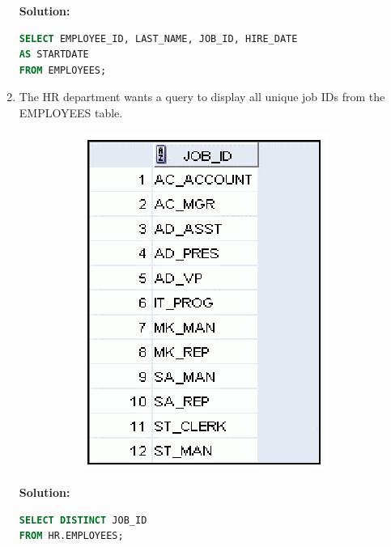 \documentclass[a4paper,12pt]{article}
\begin{document}
\begin{enumerate}[start=4]
    \textbf{Solution: }
    \begin{lstlisting}[language=SQL]
SELECT EMPLOYEE_ID, LAST_NAME, JOB_ID, HIRE_DATE 
AS STARTDATE
FROM EMPLOYEES;
    \end{lstlisting}
    
    \newpage
    \item The HR department wants a query to display all unique job IDs from the EMPLOYEES table.
    \begin{figure}[h]
        \centering
        \begin{subfigure}[b]{0.3\linewidth}
            \centering
            \includegraphics[width=\linewidth]{graphics/7.png}
        \end{subfigure}
    \end{figure}
   
    \textbf{Solution: }
    \begin{lstlisting}[language=SQL]
SELECT DISTINCT JOB_ID
FROM HR.EMPLOYEES;
    \end{lstlisting}
    
\end{enumerate}
\end{document}
